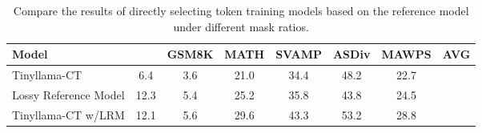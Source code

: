 \begin{table*}[t]
\centering
\small
\caption{Compare the results of directly selecting token training models based on the reference model under different mask ratios.}
\label{tab:lossy_ref_result}
\begin{tabular}{l|cccccc|c}
\toprule
\textbf{Model} & \textbf{} & \textbf{GSM8K} & \textbf{MATH} & \textbf{SVAMP} & \textbf{ASDiv} & \textbf{MAWPS} & \textbf{AVG} \\
\midrule
Tinyllama-CT & 6.4 & 3.6 & 21.0 & 34.4 & 48.2 & 22.7 \\
Lossy Reference Model & 12.3 & 5.4 & 25.2 & 35.8 & 43.8 & 24.5 \\
Tinyllama-CT w/LRM  & 12.1 & 5.6 & 29.6 & 43.3 & 53.2 & 28.8 \\
\bottomrule
\end{tabular}
\end{table*}